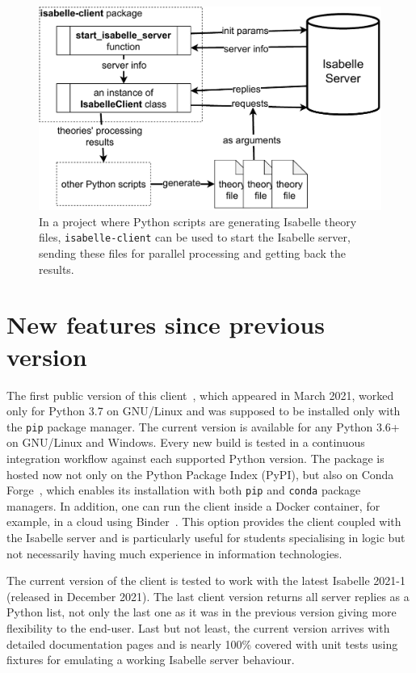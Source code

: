 \documentclass[runningheads]{llncs}
\begin{document}
\begin{figure}
\includegraphics[width=\textwidth]{architecture}
\caption{In a project where Python scripts are generating Isabelle theory files, \texttt{isabelle-client} can be used to start the Isabelle server, sending these files for parallel processing and getting back the results.} \label{fig:architecture}
\end{figure}

\section{New features since previous version}
The first public version of this client~\cite{DBLP:conf/mkm/LiskaLNRSSSW21}, which appeared in March 2021, worked only for Python 3.7 on GNU/Linux and was supposed to be installed only with the \texttt{pip} package manager. The current version is available for any Python 3.6+ on GNU/Linux and Windows. Every new build is tested in a continuous integration workflow against each supported Python version. The package is hosted now not only on the Python Package Index (PyPI), but also on Conda Forge~\cite{conda_forge_community_2015_4774216}, which enables its installation with both \texttt{pip} and \texttt{conda} package managers. In addition, one can run the client inside a Docker container, for example, in a cloud using Binder~\cite{project_jupyter-proc-scipy-2018}. This option provides the client coupled with the Isabelle server and is particularly useful for students specialising in logic but not necessarily having much experience in information technologies.

The current version of the client is tested to work with the latest Isabelle 2021-1 (released in December 2021). The last client version returns all server replies as a Python list, not only the last one as it was in the previous version giving more flexibility to the end-user. Last but not least, the current version arrives with detailed documentation pages and is nearly 100\% covered with unit tests using fixtures for emulating a working Isabelle server behaviour.
\end{document}
